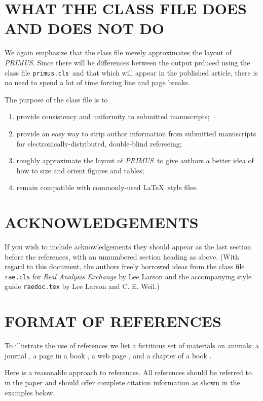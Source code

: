 \documentclass{primus}
\newcommand{\pcls}{{\tt primus.cls}}
\newcommand{\PR}{{\it PRIMUS}}
\begin{document}
\section{WHAT THE CLASS FILE DOES AND DOES NOT DO}

We again emphasize that the class file merely approximates the layout of \PR. Since there will be differences between the output prduced using the class file  \pcls\   and that which will appear in the  published article, there is no need to spend a lot of time forcing line and page breaks. 

The purpose of the class file is to
\begin{enumerate}
\item provide consistency and uniformity to submitted manuscripts;
\item provide an easy way to strip author information from submitted manuscripts for electronically-distributed, double-blind refereeing;
\item roughly approximate the layout of \PR\ to give authors a better idea of how to size and orient figures and tables; 
\item remain compatible with commonly-used \LaTeX\ style files.
\end{enumerate}




\section*{ACKNOWLEDGEMENTS}

If you wish to include acknowledgements they should appear as the last section before the references, with an unnumbered section heading as above. (With regard to this document, the authors freely borrowed ideas from the class file {\tt rae.cls} for {\it Real Analysis Exchange}  by Lee Larson and the accompanying style guide {\tt raedoc.tex} by Lee Larson and C. E. Weil.)


\section{FORMAT OF REFERENCES}

To illustrate the use of references we list a fictitious set of materials on animals:  a journal \cite{Flynn}, a page in a book \cite[p. 23]{Allen}, a web page \cite{Animal}, and a chapter of a book \cite{Wilson}.

Here is a reasonable approach to references. All references should be referred to in the paper and should offer complete citation information as shown in the examples below.
\end{document}

